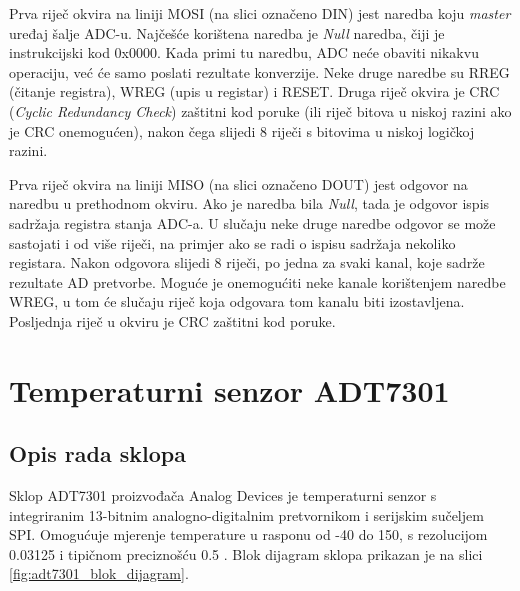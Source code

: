             Prva riječ okvira na liniji MOSI (na slici označeno DIN) jest naredba koju \textit{master} uređaj šalje ADC-u. Najčešće korištena naredba je \textit{Null} naredba, čiji je instrukcijski kod 0x0000. Kada primi tu naredbu, ADC neće obaviti nikakvu operaciju, već će samo poslati rezultate konverzije. Neke druge naredbe su RREG (čitanje registra), WREG (upis u registar) i RESET. Druga riječ okvira je CRC (\textit{Cyclic Redundancy Check}) zaštitni kod poruke (ili riječ bitova u niskoj razini ako je CRC onemogućen), nakon čega slijedi 8 riječi s bitovima u niskoj logičkoj razini.

            Prva riječ okvira na liniji MISO (na slici označeno DOUT) jest odgovor na naredbu u prethodnom okviru. Ako je naredba bila \textit{Null}, tada je odgovor ispis sadržaja registra stanja ADC-a. U slučaju neke druge naredbe odgovor se može sastojati i od više riječi, na primjer ako se radi o ispisu sadržaja nekoliko registara. Nakon odgovora slijedi 8 riječi, po jedna za svaki kanal, koje sadrže rezultate AD pretvorbe. Moguće je onemogućiti neke kanale korištenjem naredbe WREG, u tom će slučaju riječ koja odgovara tom kanalu biti izostavljena. Posljednja riječ u okviru je CRC zaštitni kod poruke.
            
    \section{Temperaturni senzor ADT7301}

        \subsection{Opis rada sklopa}
            Sklop ADT7301 proizvođača Analog Devices je temperaturni senzor s integriranim 13-bitnim analogno-digitalnim pretvornikom i serijskim sučeljem SPI. Omogućuje mjerenje temperature u rasponu od -40\textcelsius{} do 150\textcelsius{}, s rezolucijom 0.03125\textcelsius{} i tipičnom preciznošću \textpm{} 0.5\textcelsius{} \cite{adt7301_datasheet}. Blok dijagram sklopa prikazan je na slici \ref{fig:adt7301_blok_dijagram}.
            
